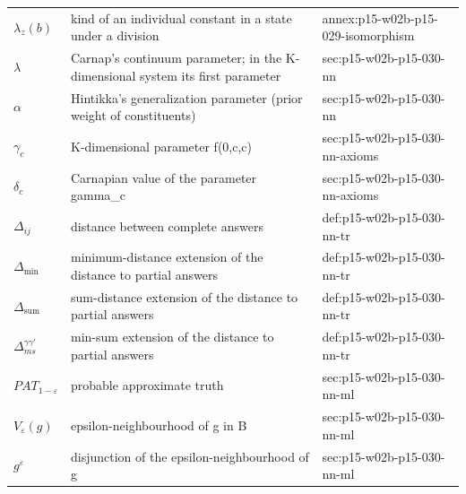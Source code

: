 \begin{longtable}{@{}p{}p{}p{}@{}}
\(\lambda_z(b)\) & kind of an individual constant in a state under a division & annex:\allowbreak{}p15-\allowbreak{}w02b-\allowbreak{}p15-\allowbreak{}029-\allowbreak{}isomorphism \\
\(\lambda\) & Carnap's continuum parameter; in the K-dimensional system its first parameter & sec:\allowbreak{}p15-\allowbreak{}w02b-\allowbreak{}p15-\allowbreak{}030-\allowbreak{}nn \\
\(\alpha\) & Hintikka's generalization parameter (prior weight of constituents) & sec:\allowbreak{}p15-\allowbreak{}w02b-\allowbreak{}p15-\allowbreak{}030-\allowbreak{}nn \\
\(\gamma_c\) & K-dimensional parameter f(0,c,c) & sec:\allowbreak{}p15-\allowbreak{}w02b-\allowbreak{}p15-\allowbreak{}030-\allowbreak{}nn-\allowbreak{}axioms \\
\(\delta_c\) & Carnapian value of the parameter gamma\_c & sec:\allowbreak{}p15-\allowbreak{}w02b-\allowbreak{}p15-\allowbreak{}030-\allowbreak{}nn-\allowbreak{}axioms \\
\(\Delta_{ij}\) & distance between complete answers & def:\allowbreak{}p15-\allowbreak{}w02b-\allowbreak{}p15-\allowbreak{}030-\allowbreak{}nn-\allowbreak{}tr \\
\(\Delta_{\min}\) & minimum-distance extension of the distance to partial answers & def:\allowbreak{}p15-\allowbreak{}w02b-\allowbreak{}p15-\allowbreak{}030-\allowbreak{}nn-\allowbreak{}tr \\
\(\Delta_{\mathrm{sum}}\) & sum-distance extension of the distance to partial answers & def:\allowbreak{}p15-\allowbreak{}w02b-\allowbreak{}p15-\allowbreak{}030-\allowbreak{}nn-\allowbreak{}tr \\
\(\Delta^{\gamma\gamma'}_{ms}\) & min-sum extension of the distance to partial answers & def:\allowbreak{}p15-\allowbreak{}w02b-\allowbreak{}p15-\allowbreak{}030-\allowbreak{}nn-\allowbreak{}tr \\
\(PAT_{1-\varepsilon}\) & probable approximate truth & sec:\allowbreak{}p15-\allowbreak{}w02b-\allowbreak{}p15-\allowbreak{}030-\allowbreak{}nn-\allowbreak{}ml \\
\(V_\varepsilon(g)\) & epsilon-neighbourhood of g in B & sec:\allowbreak{}p15-\allowbreak{}w02b-\allowbreak{}p15-\allowbreak{}030-\allowbreak{}nn-\allowbreak{}ml \\
\(g^\varepsilon\) & disjunction of the epsilon-neighbourhood of g & sec:\allowbreak{}p15-\allowbreak{}w02b-\allowbreak{}p15-\allowbreak{}030-\allowbreak{}nn-\allowbreak{}ml \\

\end{longtable}
